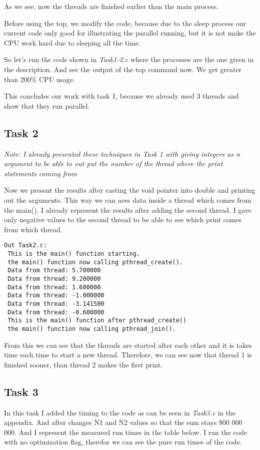 As we see, now the threads are finished earlier than the main process.

Before using the top, we modify the code, because due to the sleep process our current code only good for illustrating the parallel running, but it is not make the CPU work hard due to sleeping all the time.

So let's run the code shown in \textit{Task1-2.c} where the processes are the one given in the description. And see the output of the top command now. We get greater than 200\% CPU usage. 

This concludes our work with task 1, because we already used 3 threads and show that they run parallel.
 
\subsection*{Task 2}
\textit{Note: I already presented these techniques in Task 1 with giving integers as n argument to be able to out put the number of the thread where the print statements coming from}
\vspace{0.5 cm}

Now we present the results after casting the void pointer into double and printing out the arguments. This way we can aces data inside a thread which comes from the main(). I already represent the results after adding the second thread. I gave only negative values to the second thread to be able to see which print comes from which thread.

\begin{lstlisting}[basicstyle=\ttfamily,frame=single]
Out Task2.c:
 This is the main() function starting.
 the main() function now calling pthread_create().
 Data from thread: 5.700000
 Data from thread: 9.200000
 Data from thread: 1.600000
 Data from thread: -1.000000
 Data from thread: -3.141500
 Data from thread: -0.600000
 This is the main() function after pthread_create()
 the main() function now calling pthread_join().
\end{lstlisting}

From this we can see that the threads are started after each other and it is takes time each time to start a new thread. Therefore, we can see now that thread 1 is finished sooner, than thread 2 makes the first print.

\subsection*{Task 3}
In this task I added the timing to the code as can be seen in \textit{Task3.c} in the appendix. And after changes N1 and N2 values so that the sum stays 800 000 000. And I represent the measured run times in the table below. I run the code with no optimization flag, therefor we can see the pure run times of the code. 

